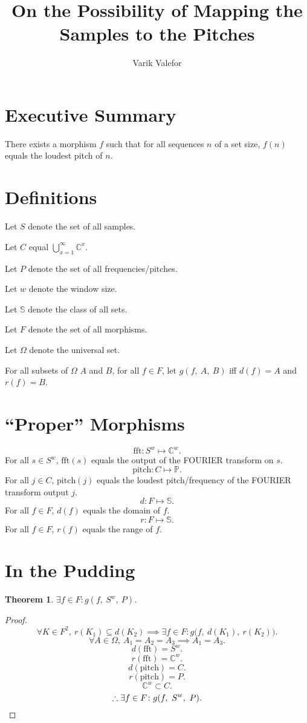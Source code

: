 \documentclass{article}
\title{On the Possibility of Mapping the Samples to the Pitches}
\author{Varik Valefor}
\newtheorem{thm}{Theorem}
\begin{document}
	\maketitle
	\section{Executive Summary}
		There exists a morphism $f$ such that for all sequences $n$ of a set size, $f(n)$ equals the loudest pitch of $n$.
	\section{Definitions}
		Let $S$ denote the set of all samples.

		Let $C$ equal $\bigcup_{x=1}^\infty \mathbb C^x$.

		Let $P$ denote the set of all frequencies/pitches.

		Let $w$ denote the window size.

		Let $\mathbb S$ denote the class of all sets.

		Let $F$ denote the set of all morphisms.

		Let $\Omega$ denote the universal set.

		For all subsets of $\Omega$ $A$ and $B$, for all $f \in F$, let $g(f,\ A,\ B)$ iff $d(f) = A$ and $r(f) = B$.
	\section{``Proper'' Morphisms}
		\[
			\mathrm{fft} \colon S^w \mapsto \mathbb C^w.
		\]
		For all $s \in S^w$, $\mathrm{fft}(s)$ equals the output of the FOURIER transform on $s$.
		\[
			\mathrm{pitch} \colon C \mapsto \mathbb P.
		\]
		For all $j \in C$, $\mathrm{pitch}(j)$ equals the loudest pitch/frequency of the FOURIER transform output $j$.
		\[
			d : F \mapsto \mathbb S.
		\]
		For all $f \in F$, $d(f)$ equals the domain of $f$.
		\[
			r : F \mapsto \mathbb S.
		\]
		For all $f \in F$, $r(f)$ equals the range of $f$.
	\section{In the Pudding}
		\begin{thm}
			$\exists f \in F \colon g(f,\ S^w,\ P)$.
		\end{thm}
		\begin{proof}
			\[
				\forall K \in F^2,\ 
				r(K_1) \subseteq d(K_2) \implies
				\exists f \in F \colon g\big(f,\ d(K_1),\ r(K_2)\big).
			\]
			\[
				\forall A \in \Omega,\ 
				A_1 = A_2 = A_3 \implies
				A_1 = A_3.
			\]
			\[
				d(\mathrm{fft}) = S^w.
			\]
			\[
				r(\mathrm{fft}) = \mathbb C^w.
			\]
			\[
				d(\mathrm{pitch}) = C.
			\]
			\[
				r(\mathrm{pitch}) = P.
			\]
			\[
				\mathbb C^w \subset C.
			\]
			\[
				\therefore \exists f \in F \colon g(f,\ S^w,\ P).\qedhere
			\]
		\end{proof}
\end{document}
